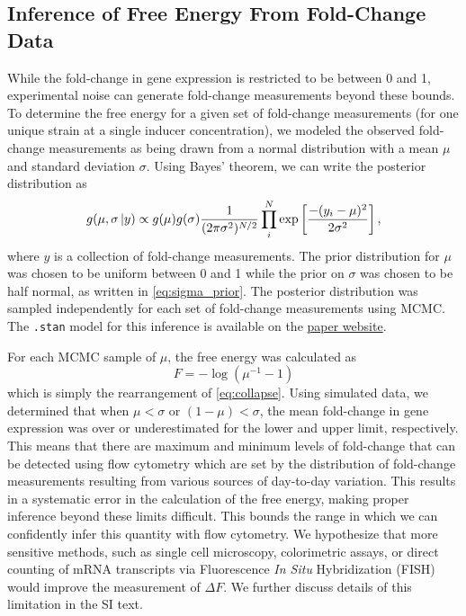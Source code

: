 \subsection{Inference of Free Energy From Fold-Change Data} While the
fold-change in gene expression is restricted to be between 0 and 1, experimental
noise can generate fold-change measurements beyond these bounds. To determine
the free energy for a given set of fold-change measurements (for one unique
strain at a single inducer concentration), we modeled the observed fold-change
measurements as being drawn from a normal distribution with a mean $\mu$
and standard deviation $\sigma$. Using Bayes' theorem, we can write
the posterior distribution as 
\begin{equation}
    g(\mu, \sigma\,\vert y) \propto
    g(\mu)g(\sigma){1\over(2\pi\sigma^2)^{N/2}}\prod\limits_i^N
    \exp\left[{-(y_i - \mu)^2 \over 2\sigma^2}\right]
    \label{eq:post_fc_mu},
\end{equation}
where $y$ is a collection of fold-change measurements. The prior distribution
for $\mu$ was chosen to be uniform between 0 and 1 while the prior on $\sigma$
was chosen to be half normal, as written in \eqref{eq:sigma_prior}. The
posterior distribution was sampled independently for each set of fold-change
measurements using MCMC. The \texttt{.stan} model for this inference is available on the
\href{http://www.rpgroup.caltech.edu/mwc_mutants}{paper website}. 

For each MCMC sample of $\mu$, the free energy was calculated as 
\begin{equation}
    F = -\log\left(\mu^{-1} - 1\right)
    \label{eq:empirical_F}
\end{equation}
which is simply the rearrangement of \eqref{eq:collapse}. Using simulated
data, we determined that when $\mu < \sigma$ or $(1 - \mu) < \sigma$, the
mean fold-change in gene expression was over or underestimated for the lower
and upper limit, respectively. This means that there are maximum and minimum
levels of fold-change that can be detected using flow cytometry which are set
by the distribution of fold-change measurements resulting from various
sources of day-to-day variation. This results in a systematic error in the
calculation of the free energy, making proper inference beyond these limits
difficult. This bounds the range in which we can confidently infer this
quantity with flow cytometry. We hypothesize that more sensitive methods,
such as single cell microscopy, colorimetric assays, or direct counting of
mRNA transcripts via Fluorescence \textit{In Situ} Hybridization (FISH) would
improve the measurement of $\Delta F$. We further discuss details of this
limitation in the SI text.

